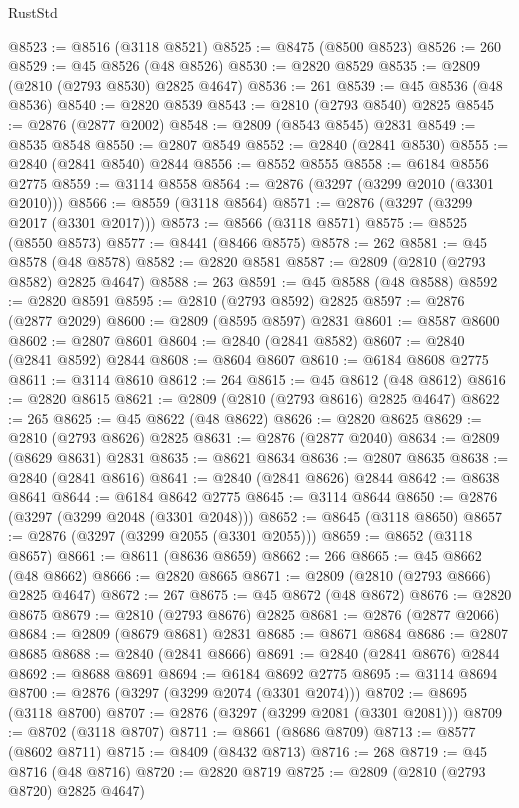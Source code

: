 \begin{lexlean}{RustStd}
\begin{coremodule}
{\begin{coremodule}
{{{{{{{{{{{{{{{{{{{{{{{{{{{{{{{{{@8523 := @8516 (@3118 @8521)
@8525 := @8475 (@8500 @8523)
@8526 := 260
@8529 := @45 @8526 (@48 @8526)
@8530 := @2820 @8529
@8535 := @2809 (@2810 (@2793 @8530) @2825 @4647)
@8536 := 261
@8539 := @45 @8536 (@48 @8536)
@8540 := @2820 @8539
@8543 := @2810 (@2793 @8540) @2825
@8545 := @2876 (@2877 @2002)
@8548 := @2809 (@8543 @8545) @2831
@8549 := @8535 @8548
@8550 := @2807 @8549
@8552 := @2840 (@2841 @8530)
@8555 := @2840 (@2841 @8540) @2844
@8556 := @8552 @8555
@8558 := @6184 @8556 @2775
@8559 := @3114 @8558
@8564 := @2876 (@3297 (@3299 @2010 (@3301 @2010)))
@8566 := @8559 (@3118 @8564)
@8571 := @2876 (@3297 (@3299 @2017 (@3301 @2017)))
@8573 := @8566 (@3118 @8571)
@8575 := @8525 (@8550 @8573)
@8577 := @8441 (@8466 @8575)
@8578 := 262
@8581 := @45 @8578 (@48 @8578)
@8582 := @2820 @8581
@8587 := @2809 (@2810 (@2793 @8582) @2825 @4647)
@8588 := 263
@8591 := @45 @8588 (@48 @8588)
@8592 := @2820 @8591
@8595 := @2810 (@2793 @8592) @2825
@8597 := @2876 (@2877 @2029)
@8600 := @2809 (@8595 @8597) @2831
@8601 := @8587 @8600
@8602 := @2807 @8601
@8604 := @2840 (@2841 @8582)
@8607 := @2840 (@2841 @8592) @2844
@8608 := @8604 @8607
@8610 := @6184 @8608 @2775
@8611 := @3114 @8610
@8612 := 264
@8615 := @45 @8612 (@48 @8612)
@8616 := @2820 @8615
@8621 := @2809 (@2810 (@2793 @8616) @2825 @4647)
@8622 := 265
@8625 := @45 @8622 (@48 @8622)
@8626 := @2820 @8625
@8629 := @2810 (@2793 @8626) @2825
@8631 := @2876 (@2877 @2040)
@8634 := @2809 (@8629 @8631) @2831
@8635 := @8621 @8634
@8636 := @2807 @8635
@8638 := @2840 (@2841 @8616)
@8641 := @2840 (@2841 @8626) @2844
@8642 := @8638 @8641
@8644 := @6184 @8642 @2775
@8645 := @3114 @8644
@8650 := @2876 (@3297 (@3299 @2048 (@3301 @2048)))
@8652 := @8645 (@3118 @8650)
@8657 := @2876 (@3297 (@3299 @2055 (@3301 @2055)))
@8659 := @8652 (@3118 @8657)
@8661 := @8611 (@8636 @8659)
@8662 := 266
@8665 := @45 @8662 (@48 @8662)
@8666 := @2820 @8665
@8671 := @2809 (@2810 (@2793 @8666) @2825 @4647)
@8672 := 267
@8675 := @45 @8672 (@48 @8672)
@8676 := @2820 @8675
@8679 := @2810 (@2793 @8676) @2825
@8681 := @2876 (@2877 @2066)
@8684 := @2809 (@8679 @8681) @2831
@8685 := @8671 @8684
@8686 := @2807 @8685
@8688 := @2840 (@2841 @8666)
@8691 := @2840 (@2841 @8676) @2844
@8692 := @8688 @8691
@8694 := @6184 @8692 @2775
@8695 := @3114 @8694
@8700 := @2876 (@3297 (@3299 @2074 (@3301 @2074)))
@8702 := @8695 (@3118 @8700)
@8707 := @2876 (@3297 (@3299 @2081 (@3301 @2081)))
@8709 := @8702 (@3118 @8707)
@8711 := @8661 (@8686 @8709)
@8713 := @8577 (@8602 @8711)
@8715 := @8409 (@8432 @8713)
@8716 := 268
@8719 := @45 @8716 (@48 @8716)
@8720 := @2820 @8719
@8725 := @2809 (@2810 (@2793 @8720) @2825 @4647)
}}}}}}}}}}}}}}}}}}}}}}}}}}}}}}}}}
\end{coremodule}}
\end{coremodule}
\end{lexlean}
